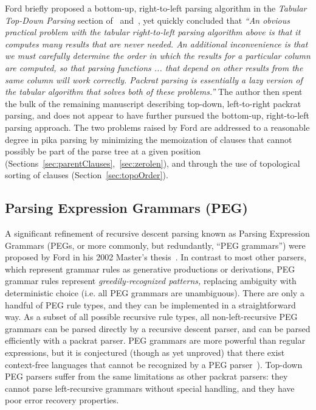 \documentclass[manuscript,screen]{acmart}
\begin{document}
Ford briefly proposed a bottom-up, right-to-left parsing algorithm in the \emph{Tabular Top-Down Parsing} section of~\citep{ford2002} and~\citep{ford2002b}, yet quickly concluded that \emph{``An obvious practical problem with the tabular right-to-left parsing algorithm above is that it computes many results that are never needed. An additional inconvenience is that we must carefully determine the order in which the results for a particular column are computed, so that parsing functions ... that depend on other results from the same column will work correctly. Packrat parsing is essentially a lazy version of the tabular algorithm that solves both of these problems.''} The author then spent the bulk of the remaining manuscript describing top-down, left-to-right packrat parsing, and does not appear to have further pursued the bottom-up, right-to-left parsing approach. The two problems raised by Ford are addressed to a reasonable degree in pika parsing by minimizing the memoization of clauses that cannot possibly be part of the parse tree at a given position (Sections~\ref{sec:parentClauses},~\ref{sec:zerolen}), and through the use of topological sorting of clauses (Section~\ref{sec:topoOrder}).

\subsection{\label{sec:peg_grammars}Parsing Expression Grammars (PEG)}

A significant refinement of recursive descent parsing known as Parsing Expression Grammars (PEGs, or more commonly, but redundantly, ``PEG grammars'') were proposed by Ford in his 2002 Master's thesis~\citep{ford2002,ford2002b}. In contrast to most other parsers, which represent grammar rules as generative productions or derivations, PEG grammar rules represent \emph{greedily-recognized patterns,} replacing ambiguity with deterministic choice (i.e. all PEG grammars are unambiguous). There are only a handful of PEG rule types, and they can be implemented in a straightforward way. As a subset of all possible recursive rule types, all non-left-recursive PEG grammars can be parsed directly by a recursive descent parser, and can be parsed efficiently with a packrat parser. PEG grammars are more powerful than regular expressions, but it is conjectured (though as yet unproved) that there exist context-free languages that cannot be recognized by a PEG parser~\citep{ford2004}). Top-down PEG parsers suffer from the same limitations as other packrat parsers: they cannot parse left-recursive grammars without special handling, and they have poor error recovery properties.
\end{document}
